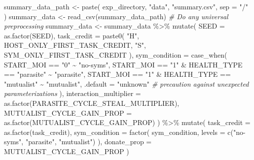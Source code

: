 \documentclass[
]{book}
\newenvironment{Shaded}{\begin{snugshade}}{\end{snugshade}}
\newcommand{\AttributeTok}[1]{\textcolor[rgb]{0.77,0.63,0.00}{#1}}
\newcommand{\CommentTok}[1]{\textcolor[rgb]{0.56,0.35,0.01}{\textit{#1}}}
\newcommand{\FunctionTok}[1]{\textcolor[rgb]{0.00,0.00,0.00}{#1}}
\newcommand{\NormalTok}[1]{#1}
\newcommand{\OtherTok}[1]{\textcolor[rgb]{0.56,0.35,0.01}{#1}}
\newcommand{\SpecialCharTok}[1]{\textcolor[rgb]{0.00,0.00,0.00}{#1}}
\newcommand{\StringTok}[1]{\textcolor[rgb]{0.31,0.60,0.02}{#1}}
\begin{document}
\begin{Shaded}
\begin{Highlighting}[]
\NormalTok{summary\_data\_path }\OtherTok{\textless{}{-}} \FunctionTok{paste}\NormalTok{(}
\NormalTok{  exp\_directory,}
  \StringTok{"data"}\NormalTok{,}
  \StringTok{"summary.csv"}\NormalTok{,}
  \AttributeTok{sep =} \StringTok{"/"}
\NormalTok{)}
\NormalTok{summary\_data }\OtherTok{\textless{}{-}} \FunctionTok{read\_csv}\NormalTok{(summary\_data\_path)}
\CommentTok{\# Do any universal preprocessing}
\NormalTok{summary\_data }\OtherTok{\textless{}{-}}\NormalTok{ summary\_data }\SpecialCharTok{\%\textgreater{}\%}
  \FunctionTok{mutate}\NormalTok{(}
    \AttributeTok{SEED =} \FunctionTok{as.factor}\NormalTok{(SEED),}
    \AttributeTok{task\_credit =} \FunctionTok{paste0}\NormalTok{(}
      \StringTok{"H"}\NormalTok{, HOST\_ONLY\_FIRST\_TASK\_CREDIT,}
      \StringTok{"S"}\NormalTok{, SYM\_ONLY\_FIRST\_TASK\_CREDIT}
\NormalTok{    ),}
    \AttributeTok{sym\_condition =} \FunctionTok{case\_when}\NormalTok{(}
\NormalTok{      START\_MOI }\SpecialCharTok{==} \StringTok{"0"} \SpecialCharTok{\textasciitilde{}} \StringTok{"no{-}syms"}\NormalTok{,}
\NormalTok{      START\_MOI }\SpecialCharTok{==} \StringTok{"1"} \SpecialCharTok{\&}\NormalTok{ HEALTH\_TYPE }\SpecialCharTok{==} \StringTok{"parasite"} \SpecialCharTok{\textasciitilde{}} \StringTok{"parasite"}\NormalTok{,}
\NormalTok{      START\_MOI }\SpecialCharTok{==} \StringTok{"1"} \SpecialCharTok{\&}\NormalTok{ HEALTH\_TYPE }\SpecialCharTok{==} \StringTok{"mutualist"} \SpecialCharTok{\textasciitilde{}} \StringTok{"mutualist"}\NormalTok{,}
      \AttributeTok{.default =} \StringTok{"unknown"} \CommentTok{\# precaution against unexpected parameterizations}
\NormalTok{    ),}
    \AttributeTok{interaction\_multiplier =} \FunctionTok{as.factor}\NormalTok{(PARASITE\_CYCLE\_STEAL\_MULTIPLIER),}
    \AttributeTok{MUTUALIST\_CYCLE\_GAIN\_PROP =} \FunctionTok{as.factor}\NormalTok{(MUTUALIST\_CYCLE\_GAIN\_PROP)}
\NormalTok{  ) }\SpecialCharTok{\%\textgreater{}\%}
  \FunctionTok{mutate}\NormalTok{(}
    \AttributeTok{task\_credit =} \FunctionTok{as.factor}\NormalTok{(task\_credit),}
    \AttributeTok{sym\_condition =} \FunctionTok{factor}\NormalTok{(}
\NormalTok{      sym\_condition,}
      \AttributeTok{levels =} \FunctionTok{c}\NormalTok{(}\StringTok{"no{-}syms"}\NormalTok{, }\StringTok{"parasite"}\NormalTok{, }\StringTok{"mutualist"}\NormalTok{)}
\NormalTok{    ),}
    \AttributeTok{donate\_prop =}\NormalTok{ MUTUALIST\_CYCLE\_GAIN\_PROP}
\NormalTok{  )}
\end{Highlighting}
\end{Shaded}
\end{document}
